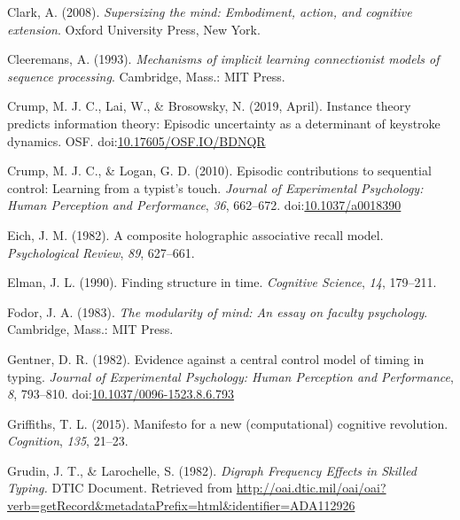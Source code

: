 \documentclass[,man,floatsintext]{apa6}
\begin{document}
\leavevmode\hypertarget{ref-clark_supersizing_2008}{}%
Clark, A. (2008). \emph{Supersizing the mind: Embodiment, action, and cognitive extension}. Oxford University Press, New York.

\leavevmode\hypertarget{ref-cleeremans_mechanisms_1993}{}%
Cleeremans, A. (1993). \emph{Mechanisms of implicit learning connectionist models of sequence processing}. Cambridge, Mass.: MIT Press.

\leavevmode\hypertarget{ref-Crump_Lai_Brosowsky_2018}{}%
Crump, M. J. C., Lai, W., \& Brosowsky, N. (2019, April). Instance theory predicts information theory: Episodic uncertainty as a determinant of keystroke dynamics. OSF. doi:\href{https://doi.org/10.17605/OSF.IO/BDNQR}{10.17605/OSF.IO/BDNQR}

\leavevmode\hypertarget{ref-crump_episodic_2010}{}%
Crump, M. J. C., \& Logan, G. D. (2010). Episodic contributions to sequential control: Learning from a typist's touch. \emph{Journal of Experimental Psychology: Human Perception and Performance}, \emph{36}, 662--672. doi:\href{https://doi.org/10.1037/a0018390}{10.1037/a0018390}

\leavevmode\hypertarget{ref-eich_composite_1982}{}%
Eich, J. M. (1982). A composite holographic associative recall model. \emph{Psychological Review}, \emph{89}, 627--661.

\leavevmode\hypertarget{ref-elman_finding_1990}{}%
Elman, J. L. (1990). Finding structure in time. \emph{Cognitive Science}, \emph{14}, 179--211.

\leavevmode\hypertarget{ref-fodor_modularity_1983}{}%
Fodor, J. A. (1983). \emph{The modularity of mind: An essay on faculty psychology}. Cambridge, Mass.: MIT Press.

\leavevmode\hypertarget{ref-GentnerEvidencecentralcontrol1982}{}%
Gentner, D. R. (1982). Evidence against a central control model of timing in typing. \emph{Journal of Experimental Psychology: Human Perception and Performance}, \emph{8}, 793--810. doi:\href{https://doi.org/10.1037/0096-1523.8.6.793}{10.1037/0096-1523.8.6.793}

\leavevmode\hypertarget{ref-griffiths_manifesto_2015}{}%
Griffiths, T. L. (2015). Manifesto for a new (computational) cognitive revolution. \emph{Cognition}, \emph{135}, 21--23.

\leavevmode\hypertarget{ref-grudin_digraph_1982}{}%
Grudin, J. T., \& Larochelle, S. (1982). \emph{Digraph Frequency Effects in Skilled Typing.} DTIC Document. Retrieved from \url{http://oai.dtic.mil/oai/oai?verb=getRecord\&metadataPrefix=html\&identifier=ADA112926}
\end{document}
